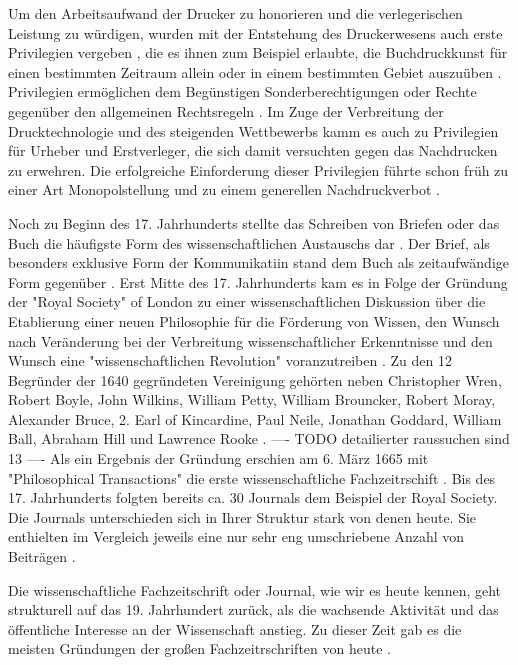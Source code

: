Um den Arbeitsaufwand der Drucker zu honorieren und die verlegerischen Leistung zu würdigen\cite{szilagyi_2011_leistungsschutzrecht}, wurden mit der Entstehung des Druckerwesens auch erste Privilegien vergeben \cite{gieseke_1995_privileg}, die es ihnen zum Beispiel erlaubte, die Buchdruckkunst für einen bestimmten Zeitraum allein oder in einem bestimmten Gebiet auszuüben \cite{martin2008publizistische} \cite{koller_1995_Urheberrecht}. Privilegien ermöglichen dem Begünstigen Sonderberechtigungen oder Rechte gegenüber den allgemeinen Rechtsregeln \cite{jänich_2002_geistiges}. Im Zuge der Verbreitung der Drucktechnologie und des steigenden Wettbewerbs kamm es auch zu Privilegien für Urheber und Erstverleger, die sich damit versuchten gegen das Nachdrucken zu erwehren. Die erfolgreiche Einforderung dieser Privilegien führte schon früh zu einer Art Monopolstellung  und zu einem generellen Nachdruckverbot \cite{szilagyi_2011_leistungsschutzrecht}.

Noch zu Beginn des 17. Jahrhunderts stellte das Schreiben von Briefen oder das Buch die häufigste Form des wissenschaftlichen Austauschs dar \cite{porter_1964_scientific}. Der Brief, als besonders exklusive Form der Kommunikatiin stand dem Buch als zeitaufwändige Form gegenüber \cite{fecher_hiig_2014}. Erst Mitte des 17. Jahrhunderts kam es in Folge der Gründung der "Royal Society" of London zu einer wissenschaftlichen Diskussion über die Etablierung einer neuen Philosophie für die Förderung von Wissen, den Wunsch nach Veränderung bei der Verbreitung wissenschaftlicher Erkenntnisse und den Wunsch eine "wissenschaftlichen Revolution" voranzutreiben \cite{Dear_1985}. Zu den 12 Begründer der 1640 gegründeten Vereinigung gehörten neben Christopher Wren, Robert Boyle, John Wilkins, William Petty, William Brouncker, Robert Moray, Alexander Bruce, 2. Earl of Kincardine, Paul Neile, Jonathan Goddard, William Ball, Abraham Hill und Lawrence Rooke \cite{suchen}. ---- TODO detailierter raussuchen sind 13 ---- Als ein Ergebnis der Gründung erschien am 6. März 1665 mit "Philosophical Transactions" die erste wissenschaftliche Fachzeitrschift \cite{suchen}. Bis des 17. Jahrhunderts folgten bereits ca. 30 Journals dem Beispiel der Royal Society. Die Journals unterschieden sich in Ihrer Struktur stark von denen heute. Sie enthielten im Vergleich jeweils eine nur sehr eng umschriebene Anzahl von Beiträgen \cite{suchen}.

Die wissenschaftliche Fachzeitschrift oder Journal, wie wir es heute kennen, geht strukturell auf das 19. Jahrhundert zurück, als die wachsende Aktivität und das öffentliche Interesse an der Wissenschaft anstieg. Zu dieser Zeit gab es die meisten Gründungen der großen Fachzeitrschriften von heute \cite{porter_1964_scientific}.


